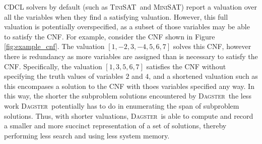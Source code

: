 \documentclass[10pt,a4paper,oneside,headinclude,footinclude,BCOR5mm]{scrartcl}
\newcommand{\dagster}{\textsc{Dagster}\xspace}
\newcommand{\tinisat}{\textsc{TiniSAT}\xspace}
\begin{document}
CDCL solvers by default (such as \tinisat\ and \textsc{MiniSAT}) report a valuation over all the variables when they find a satisfying valuation.
However, this full valuation is potentially overspecified, as a subset of those variables may be able to satisfy the CNF.
For example, consider the CNF shown in Figure \ref{fig:example_cnf}.
The valuation $[1,-2,3,-4,5,6,7]$  solves this CNF, however there is redundancy as more variables are assigned than is necessary to satisfy the CNF.
Specifically, the valuation $[1,3,5,6,7]$ satisfies the CNF without specifying the truth values of variables $2$ and $4$, and a shortened valuation such as this encompases a solution to the CNF with thoes variables specified any way. %
In this way, the shorter the subproblem solutions encountered by \dagster\, the less work \dagster\ potentially has to do in enumerating the span of subproblem solutions.
Thus, with shorter valuations, \dagster\ is able to compute and record a smaller and more succinct representation of a set of solutions, thereby performing less search and using less system memory. 
\end{document}
